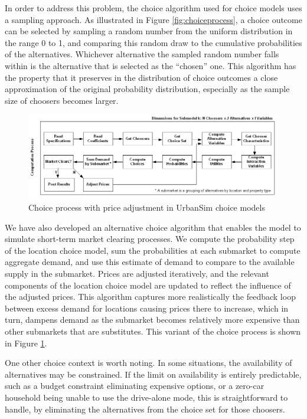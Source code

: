 In order to address this problem, the choice algorithm used for choice models uses a sampling approach. As illustrated in Figure \ref{fig:choiceprocess}, a choice outcome can be selected by sampling a random number from the uniform distribution in the range 0 to 1, and comparing this random draw to the cumulative probabilities of the alternatives. Whichever alternative the sampled random number falls within is the alternative that is selected as the \enquote{chosen} one. This algorithm has the property that it preserves in the distribution of choice outcomes a close approximation of the original probability distribution, especially as the sample size of choosers becomes larger.

\begin{figure}[htbp]
    \center
    \includegraphics[width=\textwidth]
    {graphics/ChoiceProcessWithPriceAdjustment.png}
    \caption{Choice process with price adjustment in UrbanSim choice models}
    \label{fig:choiceprocesswithprice}
\end{figure}

We have also developed an alternative choice algorithm that enables the model to simulate short-term market clearing
processes. We compute the probability step of the location choice model, sum the probabilities at each submarket to compute
aggregate demand, and use this estimate of demand to compare to the available supply in the submarket. Prices are adjusted
iteratively, and the relevant components of the location choice model are updated to reflect the influence of the adjusted
prices. This algorithm captures more realistically the feedback loop between excess demand for locations causing prices there
to increase, which in turn, dampens demand as the submarket becomes relatively more expensive than other submarkets that
are substitutes. This variant of the choice process is shown in Figure \ref{fig:choiceprocesswithprice}.

One other choice context is worth noting. In some situations, the availability of alternatives may be constrained. If the limit on availability is entirely predictable, such as a budget constraint eliminating expensive options, or a zero-car household being unable to use the drive-alone mode, this is straightforward to handle, by eliminating the alternatives from the choice set for those choosers. 

